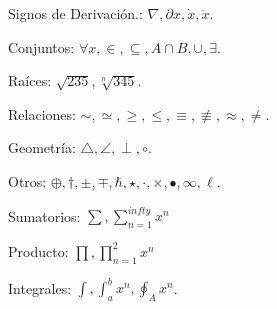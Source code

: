 \documentclass{pid}
\begin{document}
Signos de Derivación.: $\nabla, \partial x, \dot x, \ddot x$.

Conjuntos: $\forall x, \in, \subseteq, A \cap B, \cup, \exists$.

Raíces: $\sqrt{235}, \sqrt[n]{345}$.

Relaciones: $\sim, \simeq, \ge, \le, \equiv, \not\equiv, \approx, \ne$.

Geometría: $\triangle, \angle, \perp, \circ$.

Otros: $\oplus, \dagger, \pm, \mp, \hbar, \star, \cdot, \times, \bullet, \infty, \ell$.

Sumatorios: $\sum, \sum_{n=1}^{infty} x^n$

Producto: $\prod, \prod_{n=1}^2 x^n$

Integrales: $\int, \int_{a}^b x^n, \displaystyle\oint_{A} x^n$.
\end{document}
